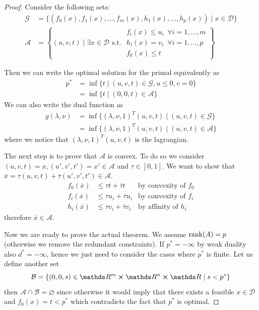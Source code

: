 \documentclass[12pt]{extarticle}
\begin{document}
\begin{proof}
	Consider the following sets:
	\begin{align}
		\mathcal G & = \{ (f_0(x), f_1(x), \dots, f_m(x), h_1(x), \dots, h_p(x)) \mid x \in \mathcal D\} \\
		\mathcal A & = \left\{ (u, v, t) \mid \exists x \in \mathcal D \text{ s.t. }
		\substack{f_i(x) \leq u_i \enspace \forall i = 1, \dots, m                                       \\
		h_i(x) = v_i \enspace \forall i = 1, \dots, p                                                    \\
			f_0(x) \leq t
		} \right\}
	\end{align}

	Then we can write the optimal solution for the primal equivalently as
	\begin{align}
		p^* & = \inf \{ t \mid (u, v, t) \in \mathcal G, u \leq 0, v = 0\} \\
		    & = \inf \{ t \mid (0, 0, t) \in \mathcal A\}
	\end{align}
	We can also write the dual function as
	\begin{align}
		g(\lambda, \nu) & = \inf \{(\lambda, \nu, 1)^T(u, v, t) \mid (u, v, t) \in \mathcal G \} \\
		                & = \inf \{(\lambda, \nu, 1)^T(u, v, t) \mid (u, v, t) \in \mathcal A \}
	\end{align}
	where we notice that $(\lambda, \nu, 1)^T(u, v, t)$ is the lagrangian.

	The next step is to prove that $\mathcal A$ is convex.
	To do so we consider $(u, v, t) = x, (u', v', t') = x' \in \mathcal A$
	and $\tau \in [0, 1]$.
	We want to show that $\overline x = \tau (u, v, t) + \overline \tau(u', v', t') \in \mathcal A$.
	\begin{align}
		f_0(\overline x) & \leq \tau t + \overline \tau t     & \text{by convexity of } f_0 \\
		f_i(\overline x) & \leq \tau u_i + \overline \tau u_i & \text{by convexity of } f_i \\
		h_i(\overline x) & \leq \tau v_i + \overline \tau v_i & \text{by affinity of } h_i
	\end{align}
	therefore $\overline x \in \mathcal A$.

	Now we are ready to prove the actual theorem.
	We assume $\rank(A) = p$ (otherwise we remove the redundant constraints).
	If $p^* = -\infty$ by weak duality also $d^* = -\infty$, hence we just need to consider the cases
	where $p^*$ is finite.
	Let us define another set
	\begin{equation}
		\mathcal B = \{(0,0,s) \in \R^m \cross \R^n \cross \R \mid s < p^* \}
	\end{equation}
	then $\mathcal A \cap \mathcal B = \varnothing$ since otherwise it would imply that
	there exists a feasible $x \in \mathcal D$ and $f_0(x) = t < p^*$ which contradicts the fact that
	$p^*$ is optimal.


\end{proof}
\end{document}
